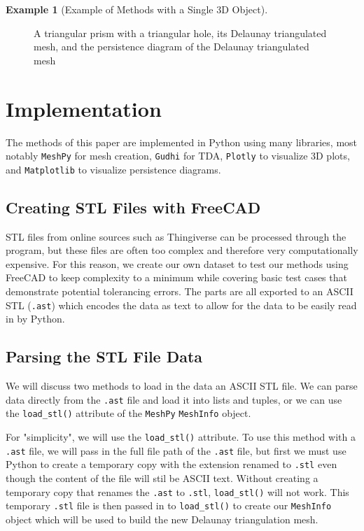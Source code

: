 \documentclass[ma]{uncgdissertationexp}
\theoremstyle{plain}
\theoremstyle{definition}
\newtheorem{example}[theorem]{Example}
\theoremstyle{remark}
\begin{document}
\begin{example}[Example of Methods with a Single 3D Object]
\begin{figure}[H]
\begin{subfigure}[b]{0.3\textwidth}
        \caption{}
        \label{fig:persdia_of_stl}
    \end{subfigure}
    \caption{A triangular prism with a triangular hole, its Delaunay triangulated mesh, and the persistence diagram of the Delaunay triangulated mesh}
    \label{fig:methods_example}
\end{figure}
\end{example}

\section{Implementation}

\par The methods of this paper are implemented in Python using many libraries, most notably \verb"MeshPy" for mesh creation, \verb"Gudhi" for TDA, \verb"Plotly" to visualize 3D plots, and \verb"Matplotlib" to visualize persistence diagrams.

\subsection{Creating STL Files with FreeCAD}
\par STL files from online sources such as Thingiverse can be processed through the program, but these files are often too complex and therefore very computationally expensive. For this reason, we create our own dataset to test our methods using FreeCAD to keep complexity to a minimum while covering basic test cases that demonstrate potential tolerancing errors. The parts are all exported to an ASCII STL (\verb".ast") which encodes the data as text to allow for the data to be easily read in by Python.

\subsection{Parsing the STL File Data}
\par We will discuss two methods to load in the data an ASCII STL file. We can parse data directly from the \verb".ast" file and load it into lists and tuples, or we can use the \verb"load_stl()" attribute of the \verb"MeshPy" \verb"MeshInfo" object.

\par For "simplicity", we will use the \verb"load_stl()" attribute. To use this method with a \verb".ast" file, we will pass in the full file path of the \verb".ast" file, but first we must use Python to create a temporary copy with the extension renamed to \verb".stl" even though the content of the file will stil be ASCII text. Without creating a temporary copy that renames the \verb".ast" to \verb".stl", \verb"load_stl()" will not work. This temporary \verb".stl" file is then passed in to \verb"load_stl()" to create our \verb"MeshInfo" object which will be used to build the new Delaunay triangulation mesh.
\end{document}
